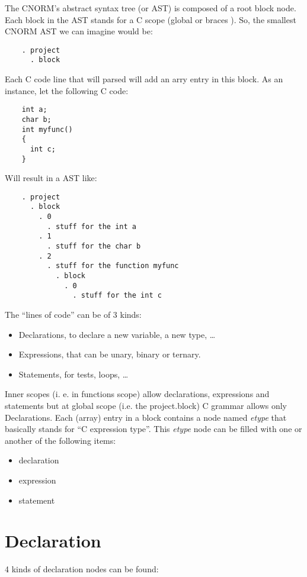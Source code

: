 \documentclass[a4paper,11pt]{report}
\begin{document}
  The CNORM's abstract syntax tree (or AST) is composed of a root block node.
  Each block in the AST stands for a C scope (global or braces {}). So, the
  smallest CNORM AST we can imagine would be:

  \begin{lstlisting}
    . project
      . block
  \end{lstlisting}

  Each C code line that will parsed will add an arry entry in this block.
  As an instance, let the following C code:

  \begin{lstlisting}
    int a;
    char b;
    int myfunc()
    {
      int c;
    }
  \end{lstlisting}

  Will result in a AST like:

  \begin{lstlisting}
    . project
      . block
        . 0
          . stuff for the int a
        . 1
          . stuff for the char b
        . 2
          . stuff for the function myfunc
            . block
              . 0
                . stuff for the int c
  \end{lstlisting}
 
  The ``lines of code'' can be of 3 kinds: 
  
  \begin{itemize}
    \item Declarations, to declare a new variable, a new type, \dots
    \item Expressions, that can be unary, binary or ternary.
    \item Statements, for tests, loops, \dots 
  \end{itemize}

  Inner scopes (i. e. in functions scope) allow declarations, expressions
  and statements but at global scope (i.e. the project.block) C grammar
  allows only Declarations. Each (array) entry in a block contains a node
  named \textit{etype} that basically stands for ``C expression type''.
  This \textit{etype} node can be filled with one or another of the
  following items:

  \begin{itemize}
    \item declaration
    \item expression
    \item statement
  \end{itemize}

  \chapter{Declaration}
  4 kinds of declaration nodes can be found:
\end{document}
